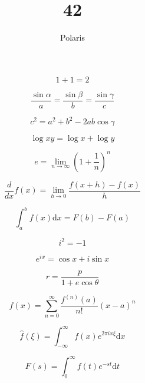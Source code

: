 \documentclass{article}
\title{42}
\author{Polaris}
\begin{document}
\maketitle

\begin{equation}
    1 + 1 = 2
\end{equation}

\begin{equation}
    \frac{\sin \alpha}{a} = \frac{\sin \beta}{b} = \frac{\sin \gamma}{c}
\end{equation}

\begin{equation}
    c^2 = a^2 + b^2 - 2ab\cos \gamma
\end{equation}

\begin{equation}
    \log xy = \log x + \log y
\end{equation}

\begin{equation}
    e = \lim_{n\to \infty} \left(1+\frac{1}{n}\right)^n
\end{equation}

\begin{equation}
    \dfrac{d}{dx}f(x) = \lim_{h\to 0}\frac{f(x+h) - f(x)}{h}
\end{equation}

\begin{equation}
    \int_{a}^{b} f(x) \mathrm{d}x = F(b) - F(a)
\end{equation}

\begin{equation}
    i^2 = -1
\end{equation}

\begin{equation}
    e^{i x}  = \cos x + i\sin x
\end{equation}

\begin{equation}
    r = \frac{p}{1 + e \cos \theta}
\end{equation}

\begin{equation}
    f(x) = \sum_{n=0}^{\infty} \frac{f^{(n)}(a)}{n!}(x-a)^n
\end{equation}

\begin{equation}
    \widehat{f}(\xi) = \int_{-\infty}^{\infty} f(x) e^{2\pi i x \xi} \mathrm{d}x
\end{equation}

\begin{equation}
    F(s) = \int_{0}^{\infty} f(t) e^{-st} \mathrm{d}t
\end{equation}
\end{document}
